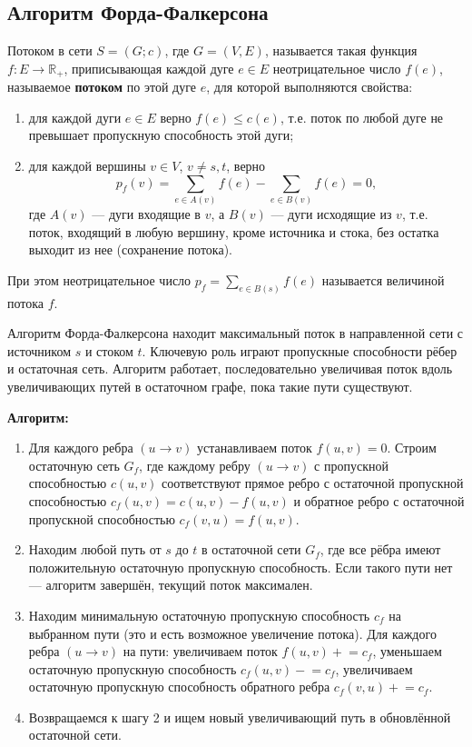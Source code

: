\subsection{Алгоритм Форда-Фалкерсона}
Потоком в сети \( S = (G; c) \), где \( G = (V, E) \), называется такая функция \( f : E \to \mathbb{R}_+ \), приписывающая каждой дуге \( e \in E \) неотрицательное число \( f(e) \), называемое \textbf{потоком} по этой дуге \( e \), для которой выполняются свойства:

\begin{enumerate}
	\item для каждой дуги \( e \in E \) верно \( f(e) \leq c(e) \), т.е. поток по любой дуге не превышает пропускную способность этой дуги;
	\item для каждой вершины \( v \in V \), \( v \neq s, t \), верно
	\[
	p_f(v) = \sum_{e \in A(v)} f(e) - \sum_{e \in B(v)} f(e) = 0,
	\]
	где $A(v)$ — дуги входящие в $v$, а $B(v)$ — дуги исходящие из $v$, т.е. поток, входящий в любую вершину, кроме источника и стока, без остатка выходит из нее (сохранение потока).
\end{enumerate}

При этом неотрицательное число \( p_f = \sum_{e \in B(s)} f(e) \) называется величиной потока \( f \).

Алгоритм Форда-Фалкерсона находит максимальный поток в направленной сети с источником $s$ и стоком $t$. Ключевую роль играют пропускные способности рёбер и остаточная сеть. Алгоритм работает, последовательно увеличивая поток вдоль увеличивающих путей в остаточном графе, пока такие пути существуют.

\textbf{Алгоритм:}
\begin{enumerate}
	\item Для каждого ребра $(u \to v)$ устанавливаем поток $f(u, v) = 0$. Строим остаточную сеть $G_f$, где каждому ребру $(u \to v)$ с пропускной способностью $c(u, v)$ соответствуют прямое ребро с остаточной пропускной способностью $c_f(u, v) = c(u, v) - f(u, v)$ и обратное ребро с остаточной пропускной способностью $c_f(v, u) = f(u, v)$.
	\item Находим любой путь от $s$ до $t$ в остаточной сети $G_f$, где все рёбра имеют положительную остаточную пропускную способность. Если такого пути нет — алгоритм завершён, текущий поток максимален.
	\item Находим минимальную остаточную пропускную способность $c_f$ на выбранном пути (это и есть возможное увеличение потока). Для каждого ребра $(u \to v)$ на пути: увеличиваем поток $f(u, v) \mathrel{+}= c_f$, уменьшаем остаточную пропускную способность $c_f(u, v) \mathrel{-}= c_f$, увеличиваем остаточную пропускную способность обратного ребра $c_f(v, u) \mathrel{+}= c_f$.
	\item Возвращаемся к шагу 2 и ищем новый увеличивающий путь в обновлённой остаточной сети.
\end{enumerate}

